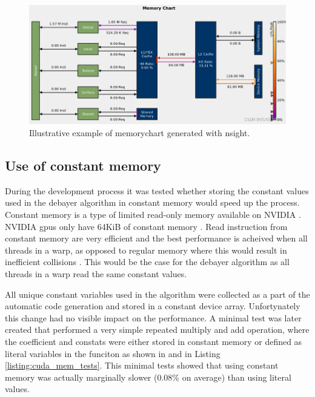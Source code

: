 \begin{figure}[H]
    \centering
    \includegraphics[width=\textwidth]{figures/cuda/cache_hits.png}
    \caption{Illustrative example of memorychart generated with \gls{nsight}. \cite{nv-computeNsightComputeMemory2022}}
    \label{fig:cache_hits}
\end{figure}


\subsection{Use of constant memory}
During the development process it was tested whether storing the constant values used in the debayer algorithm in constant memory would speed up the process.
Constant memory is a type of limited read-only memory available on NVIDIA  \cite[61]{nvidiaCUDABestPractices2023}.
NVIDIA \glspl{gpu} only have 64KiB of constant memory \cite[61]{nvidiaCUDABestPractices2023}.
Read instruction from constant memory are very efficient and the best performance is acheived when all threads in a warp, as opposed to regular memory where this would result in inefficient collisions \cite[61]{nvidiaCUDABestPractices2023} \cite[13,14]{volkovLatencyHiding2016}.
This would be the case for the debayer algorithm as all threads in a warp read the same constant values.

All unique constant variables used in the algorithm were collected as a part of the automatic code generation and stored in a constant device array.
Unfortynately this change had no visible impact on the performance.
A minimal test was later created that performed a very simple repeated multiply and add operation, where the coefficient and constats were either stored in constant memory or defined as literal variables in the funciton as shown in  and  in Listing \ref{listing:cuda_mem_tests}.
This minimal tests showed that using constant memory was actually marginally slower (0.08\% on average) than using literal values.


